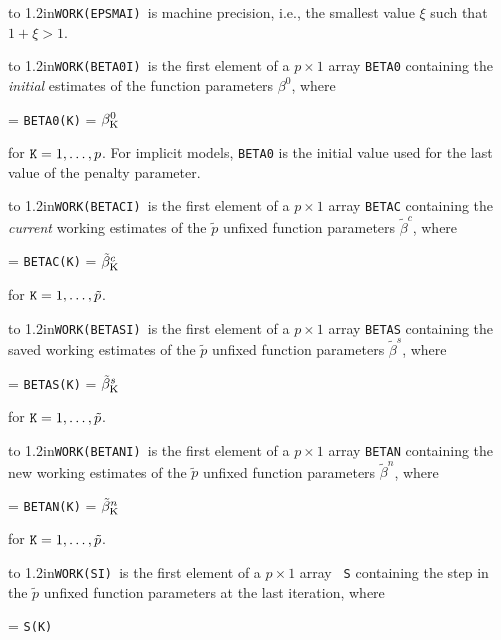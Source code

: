 \hangindent\wd\mybox{}\noindent\hbox to
1.2in{\hfill\tt WORK(EPSMAI) }is machine precision, i.e., the smallest value $\xi$ such that $1 + \xi > 1$.\bigskip

\hangindent\wd\mybox{}\noindent\hbox to
1.2in{\hfill\tt WORK(BETA0I) }is the first element of a $p \times 1$ array {\tt BETA0} containing the {\it initial\/} estimates of the function parameters
$\beta^0$, where

 = {\tt BETA0(K)} = $\beta^0_{\rm K}$

\aligntobox for ${\tt K} = 1,\ldots,p$. For implicit models, {\tt BETA0} is the initial value used for the last value of the penalty parameter.
\bigskip

\hangindent\wd\mybox{}\noindent\hbox to
1.2in{\hfill\tt WORK(BETACI) }is the first element of a $p \times 1$ array {\tt BETAC} containing the {\it current\/} working estimates of the $\tilde{p}$ unfixed function parameters $\tilde{\beta}^c$, where

 = {\tt BETAC(K)} =
$\tilde{\beta}^c_{\rm K}$

\aligntobox for ${\tt K} = 1,\ldots,\tilde{p}$.
\bigskip

\hangindent\wd\mybox{}\noindent\hbox to
1.2in{\hfill\tt WORK(BETASI) }is the first element of a $p \times 1$ array {\tt BETAS} containing the saved working estimates of the $\tilde{p}$ unfixed function parameters $\tilde{\beta}^s$, where

 = {\tt BETAS(K)} =
$\tilde{\beta}^s_{\rm K}$

\aligntobox for ${\tt K} = 1,\ldots,\tilde{p}$.
\bigskip

\hangindent\wd\mybox{}\noindent\hbox to
1.2in{\hfill\tt WORK(BETANI) }is the first element of a $p \times 1$ array {\tt BETAN} containing the new working estimates of the $\tilde{p}$ unfixed function parameters $\tilde{\beta}^n$, where

 = {\tt BETAN(K)} =
$\tilde{\beta}^n_{\rm K}$

\aligntobox for ${\tt K} = 1,\ldots,\tilde{p}$.
\bigskip

\hangindent\wd\mybox{}\noindent\hbox to
1.2in{\hfill\tt WORK(SI) }is the first element of a $p \times 1$ array {\tt
S} containing the step in the $\tilde{p}$ unfixed function parameters at the last iteration, where

 = {\tt S(K)}

